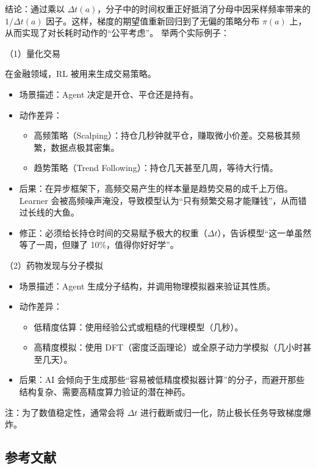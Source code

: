 结论：通过乘以 \(\Delta t(a)\)，分子中的时间权重正好抵消了分母中因采样频率带来的 \(1/\Delta t(a)\) 因子。这样，梯度的期望值重新回归到了无偏的策略分布 \(\pi(a)\) 上，从而实现了对长耗时动作的``公平考虑''。
举两个实际例子：

（1）量化交易

在金融领域，RL 被用来生成交易策略。

\begin{itemize}
\tightlist
\item
  场景描述：Agent 决定是开仓、平仓还是持有。
\item
  动作差异：

  \begin{itemize}
  \tightlist
  \item
    高频策略（Scalping）：持仓几秒钟就平仓，赚取微小价差。交易极其频繁，数据点极其密集。
  \item
    趋势策略（Trend Following）：持仓几天甚至几周，等待大行情。
  \end{itemize}
\item
  后果：在异步框架下，高频交易产生的样本量是趋势交易的成千上万倍。Learner 会被高频噪声淹没，导致模型认为``只有频繁交易才能赚钱''，从而错过长线的大鱼。
\item
  修正：必须给长持仓时间的交易赋予极大的权重（\(\Delta t\)），告诉模型``这一单虽然等了一周，但赚了 10\%，值得你好好学''。
\end{itemize}

（2）药物发现与分子模拟

\begin{itemize}
\tightlist
\item
  场景描述：Agent 生成分子结构，并调用物理模拟器来验证其性质。
\item
  动作差异：

  \begin{itemize}
  \tightlist
  \item
    低精度估算：使用经验公式或粗糙的代理模型（几秒）。
  \item
    高精度模拟：使用 DFT（密度泛函理论）或全原子动力学模拟（几小时甚至几天）。
  \end{itemize}
\item
  后果：AI 会倾向于生成那些``容易被低精度模拟器计算''的分子，而避开那些结构复杂、需要高精度算力验证的潜在神药。
\end{itemize}

注：为了数值稳定性，通常会将 \(\Delta t\) 进行截断或归一化，防止极长任务导致梯度爆炸。

\hypertarget{ux53c2ux8003ux6587ux732e-45}{%
\subsection{参考文献}\label{ux53c2ux8003ux6587ux732e-45}}

